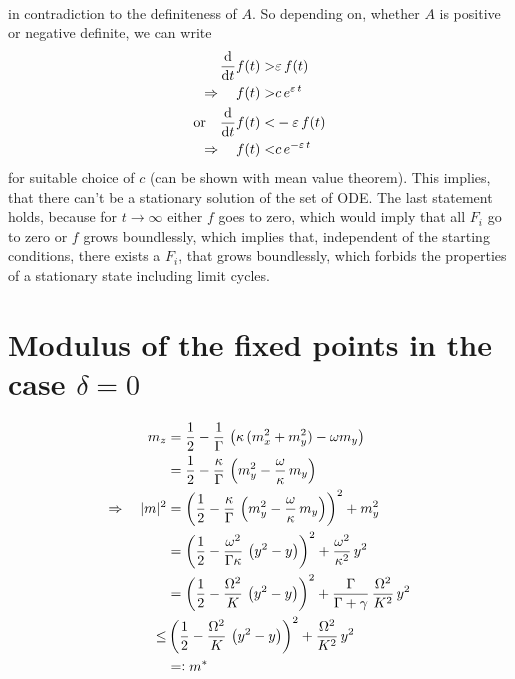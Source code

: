 \documentclass{article}
\begin{document}
\begin{appendices}
\begin{align*}
\end{align*}
in contradiction to the definiteness of $A$. So depending on, whether $A$ is positive or negative definite, we can write
\begin{align*}
    \frac{\text{d}}{\text{d}t} f(t) >& \varepsilon\,f(t)\\
    \Rightarrow\quad f(t) >& c\,e^{\varepsilon\,t}\\
    \text{or}\quad \frac{\text{d}}{\text{d}t} f(t) <& -\varepsilon\,f(t)\\
    \Rightarrow\quad f(t) <& c\,e^{-\varepsilon\,t}\\
\end{align*}
for suitable choice of $c$ (can be shown with mean value theorem). This implies, that there can't be a stationary solution of the set of ODE. The last statement holds, because for $t\rightarrow\infty$ either $f$ goes to zero, which would imply that all $F_i$ go to zero or $f$ grows boundlessly, which implies that, independent of the starting conditions, there exists a $F_i$, that grows boundlessly, which forbids the properties of a stationary state including limit cycles.

\section{Modulus of the fixed points in the case $\delta=0$}
\label{appendix:mod_of_fixp}
\begin{align*}
    m_z&=\frac{1}{2}-\frac{1}{\Gamma}\,\left( \kappa\,(m_x^2+m_y^2)-\omega m_y  \right)\\
    &=\frac{1}{2}-\frac{\kappa}{\Gamma}\,\left( m_y^2-\frac{\omega}{\kappa}\, m_y  \right)\\
    \Rightarrow\quad |m|^2&=\left( \frac{1}{2}-\frac{\kappa}{\Gamma}\,\left( m_y^2-\frac{\omega}{\kappa}\, m_y  \right) \right)^2+m_y^2\\
    &=\left( \frac{1}{2}-\frac{\omega^2}{\Gamma\kappa}\,\left( {y}^2- {y} \right) \right)^2+\frac{\omega^2}{\kappa^2}\,{y}^2\\
    &=\left( \frac{1}{2}-\frac{\Omega^2}{K}\,\left( {y}^2- {y} \right) \right)^2+\frac{\Gamma}{\Gamma+\gamma}\,\frac{\Omega^2}{K^2}\,{y}^2\\
    \leq&\left( \frac{1}{2}-\frac{\Omega^2}{K}\,\left( {y}^2- {y} \right) \right)^2+\frac{\Omega^2}{K^2}\,{y}^2\\
    &=\vcentcolon m^*
\end{align*}


\end{appendices}
\end{document}

